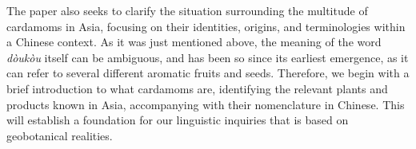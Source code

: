 \documentclass[12pt]{article}
\newcommand{\tc}[1]{\traditionalchinesefont{#1}\rmfamily}
\begin{document}





The paper also seeks to clarify the situation surrounding the multitude of cardamoms in Asia, focusing on their identities, origins, and terminologies within a Chinese context. As it was just mentioned above, the meaning of the word \textit{dòukòu} itself can be ambiguous, and has been so since its earliest emergence, as it can refer to several different aromatic fruits and seeds. Therefore, we begin with a brief introduction to what cardamoms are, identifying the relevant plants and products known in Asia, accompanying with their nomenclature in Chinese. This will establish a foundation for our linguistic inquiries that is based on geobotanical realities.
\end{document}
